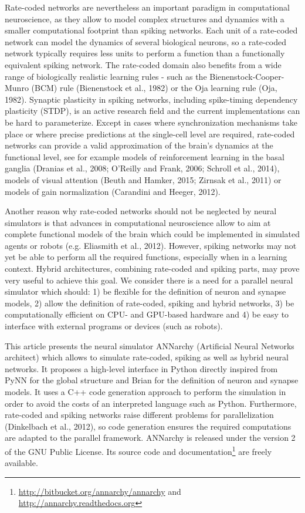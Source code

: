 \documentclass[
  11pt,
  a4paper,
]{scrbook}
\begin{document}
Rate-coded networks are nevertheless an important paradigm in
computational neuroscience, as they allow to model complex structures
and dynamics with a smaller computational footprint than spiking
networks. Each unit of a rate-coded network can model the dynamics of
several biological neurons, so a rate-coded network typically requires
less units to perform a function than a functionally equivalent spiking
network. The rate-coded domain also benefits from a wide range of
biologically realistic learning rules - such as the
Bienenstock-Cooper-Munro (BCM) rule (Bienenstock et al., 1982) or the
Oja learning rule (Oja, 1982). Synaptic plasticity in spiking networks,
including spike-timing dependency plasticity (STDP), is an active
research field and the current implementations can be hard to
parameterize. Except in cases where synchronization mechanisms take
place or where precise predictions at the single-cell level are
required, rate-coded networks can provide a valid approximation of the
brain's dynamics at the functional level, see for example models of
reinforcement learning in the basal ganglia (Dranias et al., 2008;
O'Reilly and Frank, 2006; Schroll et al., 2014), models of visual
attention (Beuth and Hamker, 2015; Zirnsak et al., 2011) or models of
gain normalization (Carandini and Heeger, 2012).

Another reason why rate-coded networks should not be neglected by neural
simulators is that advances in computational neuroscience allow to aim
at complete functional models of the brain which could be implemented in
simulated agents or robots (e.g. Eliasmith et al., 2012). However,
spiking networks may not yet be able to perform all the required
functions, especially when in a learning context. Hybrid architectures,
combining rate-coded and spiking parts, may prove very useful to achieve
this goal. We consider there is a need for a parallel neural simulator
which should: 1) be flexible for the definition of neuron and synapse
models, 2) allow the definition of rate-coded, spiking and hybrid
networks, 3) be computationally efficient on CPU- and GPU-based hardware
and 4) be easy to interface with external programs or devices (such as
robots).

This article presents the neural simulator ANNarchy (Artificial Neural
Networks architect) which allows to simulate rate-coded, spiking as well
as hybrid neural networks. It proposes a high-level interface in Python
directly inspired from PyNN for the global structure and Brian for the
definition of neuron and synapse models. It uses a C++ code generation
approach to perform the simulation in order to avoid the costs of an
interpreted language such as Python. Furthermore, rate-coded and spiking
networks raise different problems for parallelization (Dinkelbach et
al., 2012), so code generation ensures the required computations are
adapted to the parallel framework. ANNarchy is released under the
version 2 of the GNU Public License. Its source code and
documentation\footnote{\url{http://bitbucket.org/annarchy/annarchy} and
  \url{http://annarchy.readthedocs.org}} are freely available.
\end{document}
